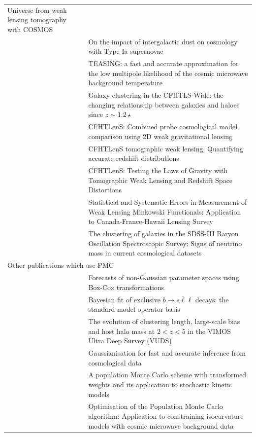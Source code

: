 \documentclass[11pt, chapterprefix, headsepline]{scrartcl}
\begin{document}
\begin{tabularx}{\textwidth}{lX}
  Universe from weak lensing tomography with COSMOS \\
  \cite{MKS10} & On the impact of intergalactic dust on cosmology with
  Type Ia supernovae \\
  \cite{2009MNRAS.400..219B} & TEASING: a fast and accurate
  approximation for the low multipole likelihood of the cosmic
  microwave background temperature \\
  \cite{CK11} & Galaxy clustering in the CFHTLS-Wide: the changing
  relationship between galaxies and haloes since $z \sim 1.2{\star}$ \\
  \cite{CFHTLenS-2pt-notomo} & CFHTLenS: Combined probe cosmological
  model comparison using 2D weak gravitational lensing \\
  \cite{CFHTLenS-2pt-tomo} & CFHTLenS tomographic weak lensing:
  Quantifying accurate redshift distributions \\
  \cite{CFHTLenS-mod-grav} & CFHTLenS: Testing the Laws of Gravity
  with Tomographic Weak Lensing and Redshift Space Distortions \\
  \cite{2013arXiv1312.5032S} & Statistical and Systematic Errors in Measurement of Weak Lensing Minkowski Functionals: Application to Canada-France-Hawaii Lensing Survey\\
  \cite{2014arXiv1403.4599B} & The clustering of galaxies in the SDSS-III Baryon Oscillation Spectroscopic Survey: Signs of neutrino mass in current cosmological datasets\\
  \multicolumn{2}{l}{Other publications which use PMC} \\ \hline
  \cite{2011arXiv1103.3370J} & Forecasts of non-Gaussian parameter
  spaces using Box-Cox transformations \\
  \cite{2012JHEP...08..030B} & Bayesian fit of exclusive $b \rightarrow s
  \bar \ell {\ell}$ decays: the standard model operator basis \\
  \cite{2014arXiv1411.5688D} & The evolution of clustering length, large-scale bias and host halo mass at $2 < z < 5$ in the VIMOS Ultra Deep Survey (VUDS) \\
  \cite{2015arXiv151000019S} & Gaussianisation for fast and accurate inference from cosmological data \\
  \cite{2012arXiv1208.5600K} & A population Monte Carlo scheme with transformed weights and its application to stochastic kinetic models \\
  \cite{2015arXiv151001486M} & Optimisation of the Population Monte Carlo algorithm: Application to constraining isocurvature models with cosmic microwave background data \\ 
\end{tabularx}
\end{document}
